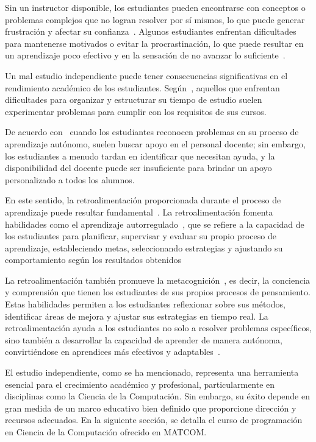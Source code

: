Sin un instructor disponible, los estudiantes pueden encontrarse con conceptos o problemas complejos que no logran resolver por sí mismos, lo que puede generar frustración y afectar su confianza~\cite{overklift2019}. Algunos estudiantes enfrentan dificultades para mantenerse motivados o evitar la procrastinación, lo que puede resultar en un aprendizaje poco efectivo y en la sensación de no avanzar lo suficiente~\cite{coto02012022}. 

Un mal estudio independiente puede tener consecuencias significativas en el rendimiento académico de los estudiantes. Según~\cite{overklift2019}, aquellos que enfrentan dificultades para organizar y estructurar su tiempo de estudio suelen experimentar problemas para cumplir con los requisitos de sus cursos.

De acuerdo con~\cite{overklift2019} cuando los estudiantes reconocen problemas en su proceso de aprendizaje autónomo, suelen buscar apoyo en el personal docente; sin embargo, los estudiantes a menudo tardan en identificar que necesitan ayuda, y la disponibilidad del docente puede ser insuficiente para brindar un apoyo personalizado a todos los alumnos.

En este sentido, la retroalimentación proporcionada durante el proceso de aprendizaje puede resultar fundamental~\cite{Sarsa_2022}. La retroalimentación fomenta habilidades como el aprendizaje autorregulado~\cite{Sarsa_2022}, que se refiere a la capacidad de los estudiantes para planificar, supervisar y evaluar su propio proceso de aprendizaje, estableciendo metas, seleccionando estrategias y ajustando su comportamiento según los resultados obtenidos

La retroalimentación también promueve la metacognición~\cite{Sarsa_2022}, es decir, la conciencia y comprensión que tienen los estudiantes de sus propios procesos de pensamiento. Estas habilidades permiten a los estudiantes reflexionar sobre sus métodos, identificar áreas de mejora y ajustar sus estrategias en tiempo real. La retroalimentación ayuda a los estudiantes no solo a resolver problemas específicos, sino también a desarrollar la capacidad de aprender de manera autónoma, convirtiéndose en aprendices más efectivos y adaptables~\cite{shute2008focus}.

El estudio independiente, como se ha mencionado, representa una herramienta esencial para el crecimiento académico y profesional, particularmente en disciplinas como la Ciencia de la Computación. Sin embargo, su éxito depende en gran medida de un marco educativo bien definido que proporcione dirección y recursos adecuados. En la siguiente sección, se detalla el curso de programación en Ciencia de la Computación ofrecido en \mbox{MATCOM}.

